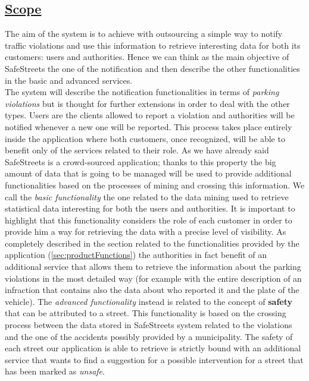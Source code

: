 \subsection[Scope]{\hyperlink{toc}{Scope}}
	The aim of the system is to achieve with outsourcing a simple way to notify traffic violations and use this information to retrieve interesting data for both its customers: users and authorities. Hence we can think as the main objective of SafeStreets the one of the notification and then describe the other functionalities in the basic and advanced services.\\
	
	The system will describe the notification functionalities in terms of \emph{parking violations} but is thought for further extensions in order to deal with the other types. Users are the clients allowed to report a violation and authorities will be notified whenever a new one will be reported. This process takes place entirely inside the application where both customers, once recognized, will be able to benefit only of the services related to their role. As we have already said SafeStreets is a crowd-sourced application; thanks to this property the big amount of data that is going to be managed will be used to provide additional functionalities based on the processes of mining and crossing this information. We call the \emph{basic functionality} the one related to the data mining used to retrieve statistical data interesting for both the users and authorities. It is important to highlight that this functionality considers the role of each customer in order to provide him a way for retrieving the data with a precise level of visibility. As completely described in the section related to the functionalities provided by the application (\ref{sec:productFunctions}) the authorities in fact benefit of an additional service that allows them to retrieve the information about the parking violations in the most detailed way (for example with the entire description of an infraction that contains also the data about who reported it and the plate of the vehicle). The \emph{advanced functionality} instead is related to the concept of \textbf{safety} that can be attributed to a street. This functionality is based on the crossing process between the data stored in SafeStreets system related to the violations and the one of the accidents possibly provided by a municipality. The safety of each street our application is able to retrieve is strictly bound with an additional service that wants to find a suggestion for a possible intervention for a street that has been marked as \emph{unsafe}.\\
	
